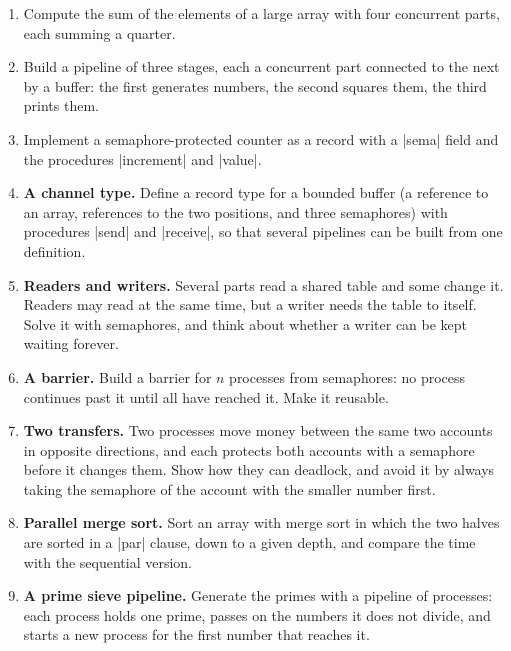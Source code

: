 \begin{enumerate}
\item Compute the sum of the elements of a large array with four
  concurrent parts, each summing a quarter.
\item Build a pipeline of three stages, each a concurrent part connected
  to the next by a buffer: the first generates numbers, the second
  squares them, the third prints them.
\item Implement a semaphore-protected counter as a record with a
  \code|sema| field and the procedures \code|increment| and \code|value|.
\item \textbf{A channel type.} Define a record type for a bounded buffer
  (a reference to an array, references to the two positions, and three
  semaphores) with procedures \code|send| and \code|receive|, so that
  several pipelines can be built from one definition.
\item \textbf{Readers and writers.} Several parts read a shared table
  and some change it. Readers may read at the same time, but a writer
  needs the table to itself. Solve it with semaphores, and think about
  whether a writer can be kept waiting forever.
\item \textbf{A barrier.} Build a barrier for $n$ processes from
  semaphores: no process continues past it until all have reached it.
  Make it reusable.
\item \textbf{Two transfers.} Two processes move money between the
  same two accounts in opposite directions, and each protects both
  accounts with a semaphore before it changes them. Show how they can
  deadlock, and avoid it by always taking the semaphore of the account
  with the smaller number first.
\item \textbf{Parallel merge sort.} Sort an array with merge sort in
  which the two halves are sorted in a \code|par| clause, down to a given
  depth, and compare the time with the sequential version.
\item \textbf{A prime sieve pipeline.} Generate the primes with a
  pipeline of processes: each process holds one prime, passes on the
  numbers it does not divide, and starts a new process for the first
  number that reaches it.
\end{enumerate}
